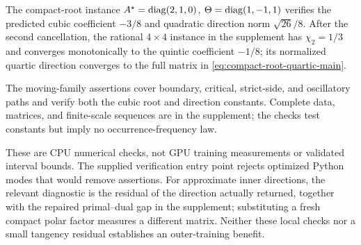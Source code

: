 The compact-root instance
\(A^\star=\operatorname{diag}(2,1,0)\), \(\Theta=\operatorname{diag}(1,-1,1)\) verifies the predicted
cubic coefficient \(-3/8\) and quadratic direction norm \(\sqrt{26}/8\).
After the second cancellation, the rational \(4\times4\) instance in the
supplement has \(\chi_2=1/3\) and converges monotonically to the quintic
coefficient \(-1/8\); its normalized quartic direction converges to the full
matrix in \eqref{eq:compact-root-quartic-main}.

The moving-family assertions cover boundary, critical, strict-side, and
oscillatory paths and verify both the cubic root and direction constants.
Complete data, matrices, and finite-scale sequences are in the supplement;
the checks test constants but imply no occurrence-frequency law.

These are CPU numerical checks, not GPU training measurements or validated
interval bounds.  The supplied verification entry point rejects optimized
Python modes that would remove assertions.  For approximate inner directions,
the relevant diagnostic is the residual of the direction actually returned,
together with the repaired primal--dual gap in the supplement; substituting a
fresh compact polar factor measures a different matrix.  Neither these local
checks nor a small tangency residual establishes an outer-training benefit.
